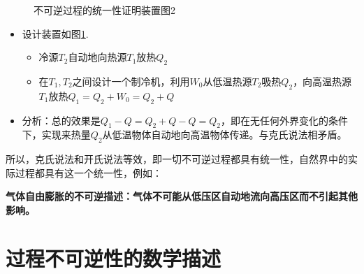 \begin{itemize}
\begin{figure}[!htb]
	\caption{不可逆过程的统一性证明装置图2}
	\label{闭式}
	\end{figure}
\end{itemize}
\begin{itemize}
	\item 设计装置如图\ref{闭式}.
	\begin{itemize}
		\item 冷源$T_2$自动地向热源$T_1$放热$Q_2$
		\item 在$T_1, T_2$之间设计一个制冷机，利用$W_0$从低温热源$T_2$吸热$Q_2$，向高温热源$T_1$放热$Q_1 = Q_2 + W_0 = Q_2 + Q$
	\end{itemize}
	\item 分析：总的效果是$Q_1 - Q = Q_2 + Q - Q = Q_2$，即在无任何外界变化的条件下，实现来热量$Q_2$从低温物体自动地向高温物体传递。与克氏说法相矛盾。
\end{itemize}
所以，克氏说法和开氏说法等效，即一切不可逆过程都具有统一性，自然界中的实际过程都具有这一个统一性，例如：
\vspace*{0.5em}

\textbf{气体自由膨胀的不可逆描述：气体不可能从低压区自动地流向高压区而不引起其他影响。}

\section{过程不可逆性的数学描述}

